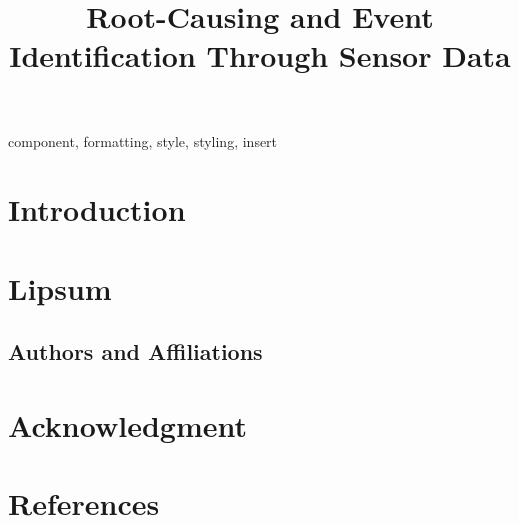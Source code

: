 \documentclass[conference]{IEEEtran}
\begin{document}
	
	\title{Root-Causing and Event Identification Through Sensor Data}
	
	\author{
	}
	
	\maketitle
	
	\begin{abstract}
	\end{abstract}
	
	\begin{IEEEkeywords}
		component, formatting, style, styling, insert
	\end{IEEEkeywords}
	
	\section{Introduction}
		
	\section{Lipsum}
	
	\subsection{Authors and Affiliations}

	
	\section{Acknowledgment}
	
	\section*{References}
	
	
\end{document}
